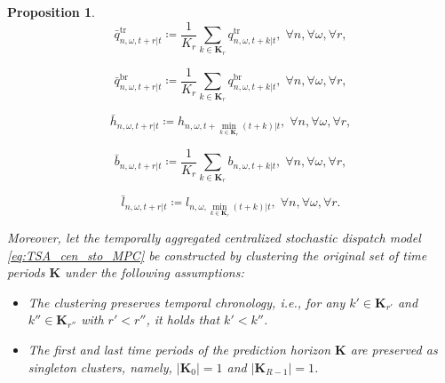 \documentclass[a4paper,fleqn]{cas-sc}
\newtheorem{proposition}{Proposition}
\begin{document}
\begin{proposition}
\noindent
\begin{minipage}{0.5\textwidth}
\begin{equation}\label{prop_agg_vars7}
\bar{q}^{\mathrm{tr}}_{n,\omega,t+r|t} \coloneqq
\frac{1}{K_r} \sum_{k \in \boldsymbol{K}_r}
q^{\mathrm{tr}}_{n,\omega,t+k|t},
\; \forall n, \forall \omega, \forall r,
\end{equation}
\end{minipage}%
\hfill
\begin{minipage}{0.5\textwidth}
\begin{equation}\label{prop_agg_vars8}
\bar{q}^{\mathrm{br}}_{n,\omega,t+r|t} \coloneqq
\frac{1}{K_r} \sum_{k \in \boldsymbol{K}_r}
q^{\mathrm{br}}_{n,\omega,t+k|t},
\; \forall n, \forall \omega, \forall r,
\end{equation}
\end{minipage}

\noindent
\begin{minipage}{0.5\textwidth}
\begin{equation}\label{prop_agg_vars9}
\bar{h}_{n,\omega,t+r|t} \coloneqq
h_{n,\omega,t+\min_{k \in \boldsymbol{K}_r}(t+k)|t},
\; \forall n, \forall \omega, \forall r,
\end{equation}
\end{minipage}%
\hfill
\begin{minipage}{0.5\textwidth}
\begin{equation}\label{prop_agg_vars10}
\bar{b}_{n,\omega,t+r|t} \coloneqq
\frac{1}{K_r} \sum_{k \in \boldsymbol{K}_r}
b_{n,\omega,t+k|t},
\; \forall n, \forall \omega, \forall r,
\end{equation}
\end{minipage}

\noindent
\begin{minipage}{0.5\textwidth}
\begin{equation}\label{prop_agg_vars11}
\bar{l}_{n,\omega,t+r|t} \coloneqq
l_{n,\omega, \min_{k \in \boldsymbol{K}_r}(t+k)|t},
\; \forall n, \forall \omega, \forall r.
\end{equation}
\end{minipage}%
\hfill
\begin{minipage}{0.5\textwidth}
\end{minipage}
\vspace{0.5cm}

Moreover, let the temporally aggregated centralized stochastic dispatch model \eqref{eq:TSA_cen_sto_MPC} be constructed by clustering the original set of time periods $\boldsymbol{K}$ under the following assumptions:
\begin{itemize}
\item[A1:] The clustering preserves temporal chronology,
i.e., for any $k' \in \boldsymbol{K}_{r'}$ and $k'' \in \boldsymbol{K}_{r''}$ with $r' < r''$, it holds that $k' < k''$.
\item[A2:] The first and last time periods of the prediction horizon $\boldsymbol{K}$ are preserved as singleton clusters, namely,
$|\boldsymbol{K}_0| = 1$ and
$|\boldsymbol{K}_{R-1}| = 1$.
\end{itemize}


\end{proposition}
\end{document}

